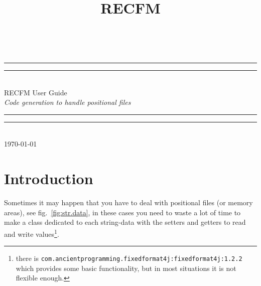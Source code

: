 \documentclass[a4paper,10pt]{report}
\title{RECFM}
\begin{document}
\begin{titlepage}
\newlength{\drop}%
\textheight
\centering
\settowidth{\unitlength}{\large\itshape xxxCode generation to handle positional filesxx}
\vspace*{\baselineskip}
\\[\baselineskip]
\rule{\unitlength}{1.6pt}\vspace*{-\baselineskip}\vspace*{2pt}
\rule{\unitlength}{0.4pt}\\[\baselineskip]
{\Huge RECFM User Guide}\\[\baselineskip]
{\large\itshape Code generation to handle positional files}\\[0.2\baselineskip]
\rule{\unitlength}{0.4pt}\vspace*{-\baselineskip}\vspace{3.2pt}
\rule{\unitlength}{1.6pt}\\[\baselineskip]
\vfill
{\small\scshape \today}\par
\vspace*{\drop}
\end{titlepage}


\section*{Introduction}
Sometimes it may happen that you have to deal with positional files (or memory 
areas), see fig.~\ref{fig:str.data}, in these cases you need to waste a lot of 
time to make a class dedicated to each string-data with the setters and getters
to read and write values\footnote{%
there is \texttt{com.ancientprogramming.fixedformat4j:fixedformat4j:1.2.2} 
which provides some basic functionality, but in most situations it is not 
flexible enough.}.
\end{document}
